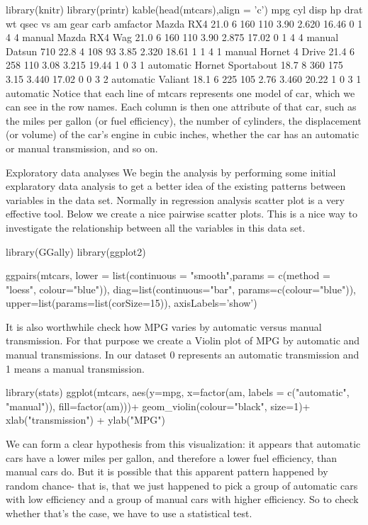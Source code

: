library(knitr)
library(printr)
kable(head(mtcars),align = 'c')
mpg	cyl	disp	hp	drat	wt	qsec	vs	am	gear	carb	amfactor
Mazda RX4	21.0	6	160	110	3.90	2.620	16.46	0	1	4	4	manual
Mazda RX4 Wag	21.0	6	160	110	3.90	2.875	17.02	0	1	4	4	manual
Datsun 710	22.8	4	108	93	3.85	2.320	18.61	1	1	4	1	manual
Hornet 4 Drive	21.4	6	258	110	3.08	3.215	19.44	1	0	3	1	automatic
Hornet Sportabout	18.7	8	360	175	3.15	3.440	17.02	0	0	3	2	automatic
Valiant	18.1	6	225	105	2.76	3.460	20.22	1	0	3	1	automatic
Notice that each line of mtcars represents one model of car, which we can see in the row names. Each column is then one attribute of that car, such as the miles per gallon (or fuel efficiency), the number of cylinders, the displacement (or volume) of the car’s engine in cubic inches, whether the car has an automatic or manual transmission, and so on.

Exploratory data analyses
We begin the analysis by performing some initial explaratory data analysis to get a better idea of the existing patterns between variables in the data set. Normally in regression analysis scatter plot is a very effective tool. Below we create a nice pairwise scatter plots. This is a nice way to investigate the relationship between all the variables in this data set.

library(GGally)
library(ggplot2)

ggpairs(mtcars, 
        lower = list(continuous = "smooth",params = c(method = "loess", colour="blue")),
        diag=list(continuous="bar", params=c(colour="blue")),
        upper=list(params=list(corSize=15)), 
        axisLabels='show')


It is also worthwhile check how MPG varies by automatic versus manual transmission. For that purpose we create a Violin plot of MPG by automatic and manual transmissions. In our dataset 0 represents an automatic transmission and 1 means a manual transmission.

library(stats) 
ggplot(mtcars, aes(y=mpg, x=factor(am, labels = c("automatic", "manual")), fill=factor(am)))+
        geom_violin(colour="black", size=1)+
        xlab("transmission") + ylab("MPG")

We can form a clear hypothesis from this visualization: it appears that automatic cars have a lower miles per gallon, and therefore a lower fuel efficiency, than manual cars do. But it is possible that this apparent pattern happened by random chance- that is, that we just happened to pick a group of automatic cars with low efficiency and a group of manual cars with higher efficiency. So to check whether that’s the case, we have to use a statistical test.

